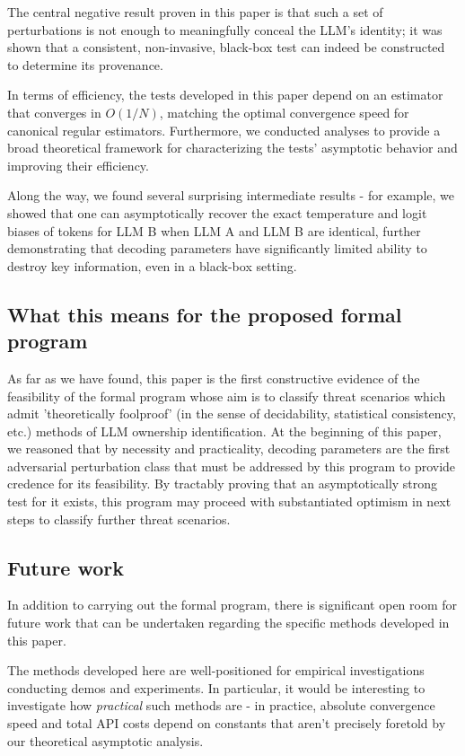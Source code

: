 \documentclass{article}
\begin{document}
The central negative result proven in this paper is that such a set of perturbations is not enough to meaningfully conceal the LLM's identity; it was shown that a consistent, non-invasive, black-box test can indeed be constructed to determine its provenance.

In terms of efficiency, the tests developed in this paper depend on an estimator that converges in $O(1/N)$, matching the optimal convergence speed for canonical regular estimators. Furthermore, we conducted analyses to provide a broad theoretical framework for characterizing the tests' asymptotic behavior and improving their efficiency.

Along the way, we found several surprising intermediate results - for example, we showed that one can asymptotically recover the exact temperature and logit biases of tokens for LLM B when LLM A and LLM B are identical, further demonstrating that decoding parameters have significantly limited ability to destroy key information, even in a black-box setting.

\subsection{What this means for the proposed formal program}
As far as we have found, this paper is the first constructive evidence of the feasibility of the formal program whose aim is to classify threat scenarios which admit 'theoretically foolproof' (in the sense of decidability, statistical consistency, etc.) methods of LLM ownership identification. At the beginning of this paper, we reasoned that by necessity and practicality, decoding parameters are the first adversarial perturbation class that must be addressed by this program to provide credence for its feasibility. By tractably proving that an asymptotically strong test for it exists, this program may proceed with substantiated optimism in next steps to classify further threat scenarios.

\subsection{Future work}
In addition to carrying out the formal program, there is significant open room for future work that can be undertaken regarding the specific methods developed in this paper.

The methods developed here are well-positioned for empirical investigations conducting demos and experiments. In particular, it would be interesting to investigate how \textit{practical} such methods are - in practice, absolute convergence speed and total API costs depend on constants that aren't precisely foretold by our theoretical asymptotic analysis.
\end{document}
